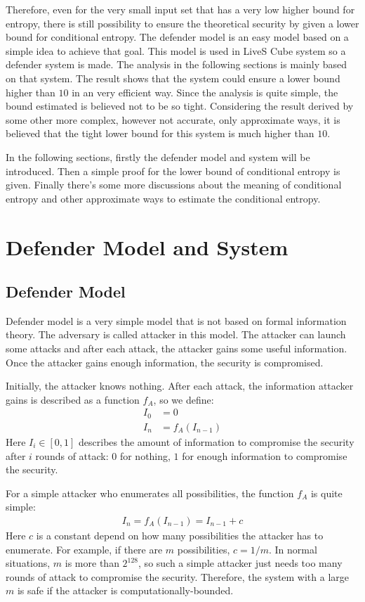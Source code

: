 \documentclass[10pt,a4paper]{article}
\begin{document}
	Therefore, even for the very small input set that has a very low
	higher bound for entropy, there is still possibility to ensure the
	theoretical security by given a lower bound for conditional entropy.
	The defender model is an easy model based on a simple idea to achieve that goal.
	This model is used in LiveS Cube system so a defender system is made.
	The analysis in the following sections is mainly based on that system.
	The result shows that the system could ensure a lower bound higher than 
	$10$ in an very efficient way. Since the analysis is quite simple, the
	bound estimated is believed not to be so tight. 
	Considering the result derived by some other
	more complex, however not accurate, only approximate ways, it is believed
	that the tight lower bound for this system is much higher than $10$.
	
	In the following sections, firstly the defender model and system will be
	introduced. Then a simple proof for the lower bound of conditional entropy
	is given. Finally there's some more discussions about the meaning of
	conditional entropy and other approximate ways to estimate the conditional
	entropy.
	
\section{Defender Model and System}
	\subsection{Defender Model}
		Defender model is a very simple model that
		is not based on formal information theory.
		The adversary is called attacker in this model.
		The attacker can launch some attacks and after
		each attack, the attacker gains some useful information.
		Once the attacker gains enough information, the security
		is compromised.
		
		Initially, the attacker knows nothing. After
		each attack, the information attacker gains
		is described as a function $f_A$, so we define:
		\begin{align}
			I_0 &= 0\\
			I_n &= f_A(I_{n-1})\label{AONLY}
		\end{align}
		Here $I_i \in [0, 1]$ describes the amount of information
		to compromise the security after $i$
		rounds of attack: $0$ for nothing, $1$ for enough
		information to compromise the security.
		
		For a simple attacker who enumerates all possibilities, the
		function $f_A$ is quite simple:
		\begin{align}
			I_n = f_A(I_{n-1}) = I_{n-1}+c\label{AONLYE}
		\end{align}
		Here $c$ is a constant depend on how many possibilities the
		attacker has to enumerate. For example, if there are
		$m$ possibilities, $c = 1/m$. In normal situations, $m$ is more
		than $2^{128}$, so such a simple attacker just needs too many rounds
		of attack to compromise the security. Therefore, the system with
		a large $m$ is safe if the attacker is computationally-bounded.
		
\end{document}
